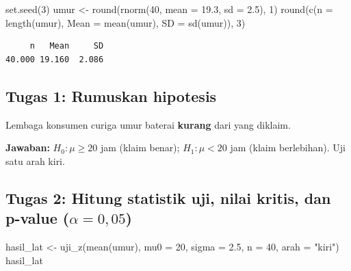 \documentclass[
  indonesian,
  letterpaper,
]{book}
\newenvironment{Shaded}{\begin{snugshade}}{\end{snugshade}}
\newcommand{\AttributeTok}[1]{\textcolor[rgb]{0.40,0.45,0.13}{#1}}
\newcommand{\DecValTok}[1]{\textcolor[rgb]{0.68,0.00,0.00}{#1}}
\newcommand{\FloatTok}[1]{\textcolor[rgb]{0.68,0.00,0.00}{#1}}
\newcommand{\FunctionTok}[1]{\textcolor[rgb]{0.28,0.35,0.67}{#1}}
\newcommand{\NormalTok}[1]{\textcolor[rgb]{0.00,0.23,0.31}{#1}}
\newcommand{\OtherTok}[1]{\textcolor[rgb]{0.00,0.23,0.31}{#1}}
\newcommand{\StringTok}[1]{\textcolor[rgb]{0.13,0.47,0.30}{#1}}
\begin{document}
\begin{Shaded}
\begin{Highlighting}[]
\FunctionTok{set.seed}\NormalTok{(}\DecValTok{3}\NormalTok{)}
\NormalTok{umur }\OtherTok{\textless{}{-}} \FunctionTok{round}\NormalTok{(}\FunctionTok{rnorm}\NormalTok{(}\DecValTok{40}\NormalTok{, }\AttributeTok{mean =} \FloatTok{19.3}\NormalTok{, }\AttributeTok{sd =} \FloatTok{2.5}\NormalTok{), }\DecValTok{1}\NormalTok{)}
\FunctionTok{round}\NormalTok{(}\FunctionTok{c}\NormalTok{(}\AttributeTok{n =} \FunctionTok{length}\NormalTok{(umur), }\AttributeTok{Mean =} \FunctionTok{mean}\NormalTok{(umur), }\AttributeTok{SD =} \FunctionTok{sd}\NormalTok{(umur)), }\DecValTok{3}\NormalTok{)}
\end{Highlighting}
\end{Shaded}

\begin{verbatim}
     n   Mean     SD 
40.000 19.160  2.086 
\end{verbatim}

\subsection{Tugas 1: Rumuskan
hipotesis}\label{tugas-1-rumuskan-hipotesis}

Lembaga konsumen curiga umur baterai \textbf{kurang} dari yang diklaim.

\textbf{Jawaban:} \(H_0: \mu \geq 20\) jam (klaim benar);
\(H_1: \mu < 20\) jam (klaim berlebihan). Uji satu arah kiri.

\subsection{\texorpdfstring{Tugas 2: Hitung statistik uji, nilai kritis,
dan p-value
(\(\alpha = 0{,}05\))}{Tugas 2: Hitung statistik uji, nilai kritis, dan p-value (\textbackslash alpha = 0\{,\}05)}}\label{tugas-2-hitung-statistik-uji-nilai-kritis-dan-p-value-alpha-005}

\begin{Shaded}
\begin{Highlighting}[]
\NormalTok{hasil\_lat }\OtherTok{\textless{}{-}} \FunctionTok{uji\_z}\NormalTok{(}\FunctionTok{mean}\NormalTok{(umur), }\AttributeTok{mu0 =} \DecValTok{20}\NormalTok{, }\AttributeTok{sigma =} \FloatTok{2.5}\NormalTok{, }\AttributeTok{n =} \DecValTok{40}\NormalTok{, }\AttributeTok{arah =} \StringTok{"kiri"}\NormalTok{)}
\NormalTok{hasil\_lat}
\end{Highlighting}
\end{Shaded}
\end{document}
